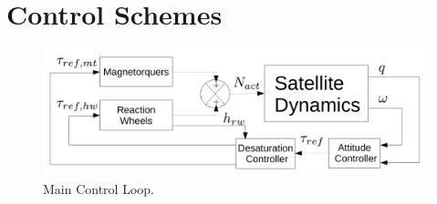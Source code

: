 \chapter{Control Schemes}

\begin{figure}[h!]
	\centering 
	\includegraphics[width=170mm]{figures/mainLoop.pdf}	
	\caption{Main Control Loop.}
	\label{label{fig:mainLoop}}
\end{figure}




